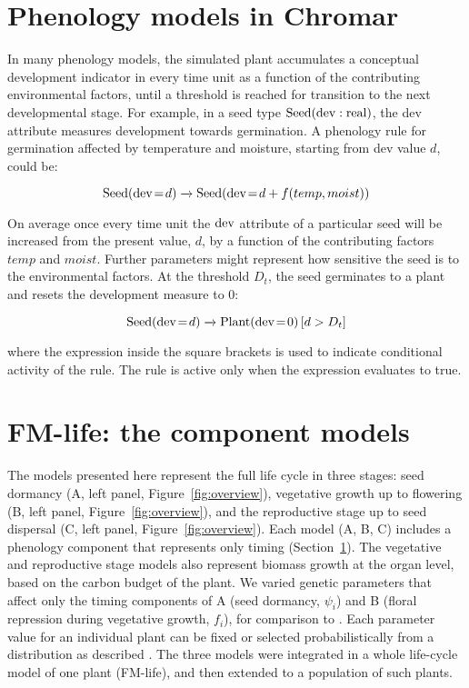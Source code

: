 \section{Phenology models in Chromar}
\label{phenology-models-in-chromar}
In many phenology models, the simulated plant accumulates a conceptual
development indicator in every time unit as a function of the
contributing environmental factors, until a threshold is reached for
transition to the next developmental stage. For example, in a seed type
\(\mathrm{Seed}(\mathrm{dev}:\mathrm{real})\), the dev attribute measures
development towards germination. A phenology rule for germination
affected by temperature and moisture, starting from dev value $d$,
could be:

\[\mathrm{Seed}(\mathrm{dev} \! = \! {d}) \xrightarrow{} \mathrm{Seed}(\mathrm{dev} \! = \! {d + f(temp,moist)}) \]

On average once every time unit the $\mathrm{dev}$ attribute of a
particular seed will be increased from the present value, \(d\), by a
function of the contributing factors $temp$ and
$moist$. Further parameters might represent how sensitive the
seed is to the environmental factors. At the threshold
$D_t$, the seed germinates to a plant and resets the
development measure to 0:

\[\mathrm{Seed}(\mathrm{dev} \! = \! {d}) \xrightarrow{} \mathrm{Plant}(\mathrm{dev} \! = \! {0}) \, \lbrack d > D_{t}\rbrack \]

where the expression inside the square brackets is used to indicate
conditional activity of the rule. The rule is active only when the
expression evaluates to true.

\section{FM-life: the component models}
\label{sec:compModels}
The models presented here represent the full life cycle in three stages: seed
dormancy (A, left panel, Figure~\ref{fig:overview}), vegetative growth up to
flowering (B, left panel, Figure~\ref{fig:overview}), and the reproductive stage
up to seed dispersal (C, left panel, Figure~\ref{fig:overview}). Each model (A,
B, C) includes a phenology component that represents only timing
(Section~\ref{phenology-models-in-chromar}). The vegetative and reproductive
stage models also represent biomass growth at the organ level, based on the
carbon budget of the plant. We varied genetic parameters that affect only the
timing components of A (seed dormancy, \(\psi_{i}\)) and B (floral repression
during vegetative growth, \(f_{i}\)), for comparison to
\citet{burghardt_modeling_2015}.  Each parameter value for an individual plant
can be fixed or selected probabilistically from a distribution as described
\citep{burghardt_modeling_2015}. The three models were integrated in a whole
life-cycle model of one plant (FM-life), and then extended to a population of
such plants.

